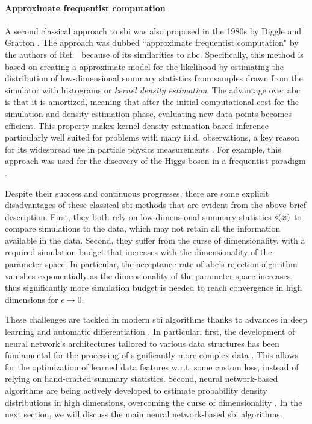 \paragraph*{Approximate frequentist computation}
A second classical approach to \gls*{sbi} was also proposed in the 1980s by Diggle and Gratton \cite{diggle1984monte}. The approach was dubbed ``approximate frequentist computation" by the authors of Ref.~\cite{brehmer2018guide} because of its similarities to \gls*{abc}. Specifically, this method is based on creating a approximate model for the likelihood by estimating the distribution of low-dimensional summary statistics from samples drawn from the simulator with histograms or \emph{kernel density estimation}. The advantage over \gls*{abc} is that it is amortized, meaning that after the initial computational cost for the simulation and density estimation phase, evaluating new data points becomes efficient.
This property makes kernel density estimation-based inference particularly well suited for problems with many i.i.d. observations, a key reason for its widespread use in particle physics measurements \cite{Brehmer:2020cvb}. For example, this approach was used for the discovery of the Higgs boson in a frequentist paradigm \cite{brehmer2018guide}. 

Despite their success and continuous progresses, there are some explicit disadvantages of these classical \gls*{sbi} methods that are evident from the above brief description. First, they both rely on low-dimensional summary statistics $s(\bm{x})$ to compare simulations to the data, which may not retain all the information available in the data. Second, they suffer from the curse of dimensionality, with a required simulation budget that increases with the dimensionality of the parameter space. In particular, the acceptance rate of \gls*{abc}'s rejection algorithm vanishes exponentially as the dimensionality of the parameter space increases, thus significantly more simulation budget is needed to reach convergence in high dimensions for $\epsilon \to 0$.

These challenges are tackled in modern \gls*{sbi} algorithms thanks to advances in deep learning \cite{lecun2015deep} and automatic differentiation \cite{baydin2018automatic}. In particular, first, the development of neural network's architectures tailored to various data structures has been fundamental for the processing of significantly more complex data  \cite{lecun2015deep}. This allows for the optimization of learned data features w.r.t. some custom loss, instead of relying on hand-crafted summary statistics. Second, neural network-based algorithms are being actively developed to estimate probability density distributions in high dimensions, overcoming the curse of dimensionality \cite[\eg][]{papamakarios2019neural, papamakarios2021normalizing, Papamakarios:2016ctj}. In the next section, we will discuss the main neural network-based \gls*{sbi} algorithms. 


